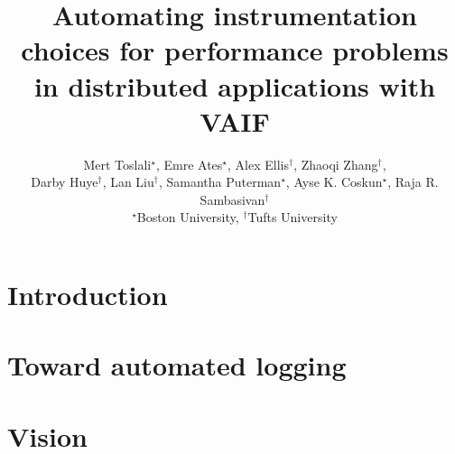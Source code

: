 \date{}

\title{Automating instrumentation choices for performance problems in distributed applications with VAIF}
\author{Mert Toslali$^{\star}$, Emre Ates$^{\star}$, Alex Ellis$^{\dagger}$, Zhaoqi Zhang$^{\dagger}$, \\
Darby Huye$^{\dagger}$, Lan Liu$^{\dagger}$, Samantha Puterman$^{\star}$, Ayse K. Coskun$^{\star}$, Raja R. Sambasivan$^{\dagger}$
  \\{$^{\star}$Boston University, $^{\dagger}$Tufts University}
}
\maketitle

\begin{abstract}

\end{abstract}


\section{Introduction}




\section{Toward automated logging}



\section{Vision}

